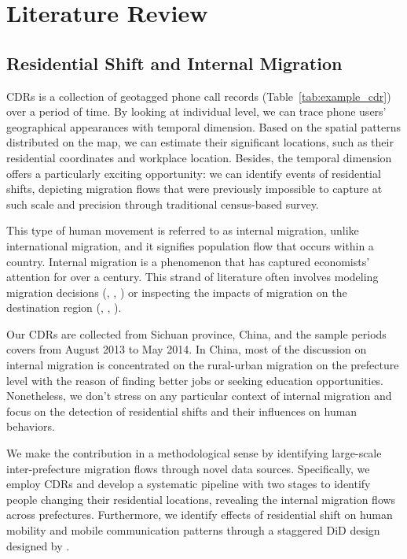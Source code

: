 \chapter{Literature Review}
\section{Residential Shift and Internal Migration}
CDRs is a collection of geotagged phone call records (Table~\ref{tab:example_cdr}) over a period of time.
By looking at individual level, we can trace phone users' geographical appearances with temporal dimension.
Based on the spatial patterns distributed on the map, we can estimate their significant locations, such as their residential coordinates and workplace location.
Besides, the temporal dimension offers a particularly exciting opportunity: we can identify events of residential shifts, depicting migration flows that were previously impossible to capture at such scale and precision through traditional census-based survey.


This type of human movement is referred to as internal migration, unlike international migration, and it signifies population flow that occurs within a country.
Internal migration is a phenomenon that has captured economists' attention for over a century.
This strand of literature often involves modeling migration decisions (\cite{hunt2004north}, \cite{espindola2006harris}, \cite{wang2023job}) or inspecting the impacts of migration on the destination region (\cite{boustan2010effect}, \cite{bryan2019aggregate}, \cite{imbert2022migrants}).

Our CDRs are collected from Sichuan province, China, and the sample periods covers from August 2013 to May 2014. In China, most of the discussion on internal migration is concentrated on the rural-urban migration on the prefecture level with the reason of finding better jobs or seeking education opportunities. Nonetheless, we don't stress on any particular context of internal migration and focus on the detection of residential shifts and their influences on human behaviors.

We make the contribution in a methodological sense by identifying large-scale inter-prefecture migration flows through novel data sources. Specifically, we employ CDRs and develop a systematic pipeline with two stages to identify people changing their residential locations, revealing the internal migration flows across prefectures. Furthermore, we identify effects of residential shift on human mobility and mobile communication patterns through a staggered DiD design designed by \cite{callaway2021difference}.

